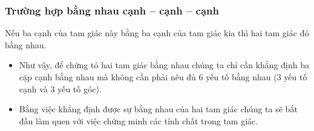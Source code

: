 \subsubsection{Trường hợp bằng nhau cạnh – cạnh – cạnh}
\begin{dl}
Nếu ba cạnh của tam giác này bằng ba cạnh của tam giác kia thì hai tam giác đó bằng nhau.
\end{dl}
\begin{nx}
\hfill
\begin{itemize}
	\item Như vậy, để chứng tỏ hai tam giác bằng nhau chúng ta chỉ cần khẳng định ba cặp cạnh bằng nhau mà không cần phải nêu đủ $6$ yếu tố bằng nhau ($3$ yếu tố cạnh và $3$ yếu tố góc).
	\item Bằng việc khẳng định được sự bằng nhau của hai tam giác chúng ta sẽ bắt đầu làm quen với việc chứng minh các tính chất trong tam giác.
\end{itemize}
\end{nx}


